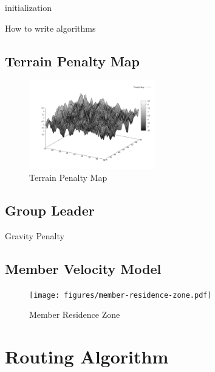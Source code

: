 \documentclass[journal]{IEEEtran}
\begin{document}
\begin{algorithm}[H]
  \SetLine
  initialization\;
  \caption{How to write algorithms}
\end{algorithm}

\subsection{Terrain Penalty Map}

\begin{figure}
    \centering
    \includegraphics[width=0.49\textwidth]{figures/penalty-map-3d.pdf}
    \caption{Terrain Penalty Map}%
    \label{fig:terrain-penalty-map}
\end{figure}

\subsection{Group Leader}

Gravity Penalty

\subsection{Member Velocity Model}

\begin{figure}
    \centering
    \texttt{[image: figures/member-residence-zone.pdf]}
    \caption{Member Residence Zone}%
    \label{fig:member:residence:zone}
\end{figure}

\section{Routing Algorithm}
\end{document}
